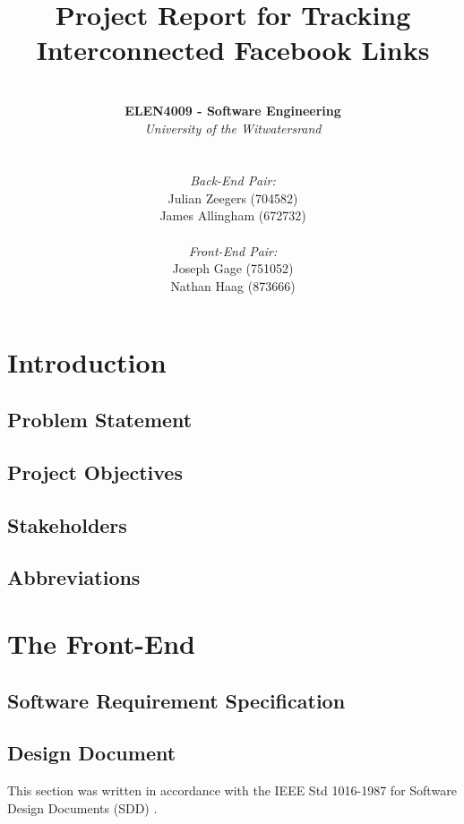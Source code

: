 \documentclass[10pt,onecolumn]{article}
\title{\vspace{-4.2cm} \huge Project Report for Tracking Interconnected Facebook Links }
\author{ \horrule{1pt} \\ \textbf{ELEN4009 - Software Engineering} \\ \emph{University of the Witwatersrand} \\ \horrule{1pt} \\\\ \emph{Back-End Pair:} \\ Julian Zeegers (704582) \\ James Allingham (672732) \\ \\ \emph{Front-End Pair:} \\ Joseph Gage (751052)\\ Nathan Haag (873666) \\ \horrule{1pt}}
\begin{document}
\date{\vspace{-5ex}}
\maketitle
\pagestyle{plain}
\setcounter{page}{1}
\newpage

\section{Introduction}

	\subsection{Problem Statement} %

	\subsection{Project Objectives} %

	\subsection{Stakeholders} %

	\subsection{Abbreviations} %

\section{The Front-End}

	\subsection{Software Requirement Specification} %

	\subsection{Design Document} %
	This section was written in accordance with the IEEE Std 1016-1987 for Software Design Documents (SDD) \cite{IEEE}. 
	
\end{document}
